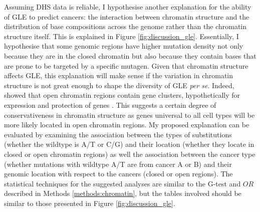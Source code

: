 Assuming DHS data is reliable, I hypothesise another explanation for the ability of GLE to predict cancers: the interaction between chromatin structure and the distribution of base compositions across the genome rather than the chromatin structure itself. This is explained in Figure \ref{fig:discussion_gle}. Essentially, I hypothesise that some genomic regions have higher mutation density not only because they are in the closed chromatin but also because they contain bases that are prone to be targeted by a specific mutagen. Given that chromatin structure affects GLE, this explanation will make sense if the variation in chromatin structure is not great enough to shape the diversity of GLE \textit{per se}. Indeed, \citet{Gilbert2004ChromatinFibers} showed that open chromatin regions contain gene clusters, hypothetically for expression and protection of genes \citep{Gilbert2004ChromatinFibers,Gazave2005DoesDamage}. This suggests a certain degree of conservativeness in chromatin structure as genes universal to all cell types will be more likely located in open chromatin regions. My proposed explanation can be evaluated by examining the association between the types of substitutions (whether the wildtype is A/T or C/G) and their location (whether they locate in closed or open chromatin regions) as well the association between the cancer type (whether mutations with wildtype A/T are from cancer A or B) and their genomic location with respect to the cancers (closed or open regions). The statistical techniques for the suggested analyses are similar to the G-test and $OR$ described in Methods \ref{methods:chromatin}, but the tables involved should be similar to those presented in Figure \ref{fig:discussion_gle}.




